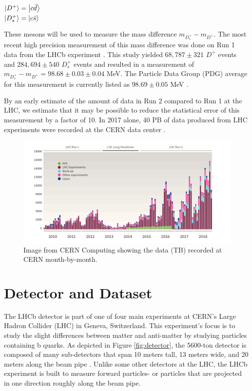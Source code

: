 \documentclass[12pt, letterpaper]{article}
\begin{document}
\begin{center}
$\ket{D^+} = \ket{c\bar{d}}$ \\
$\ket{D^+_s} = \ket{c\bar{s}}$ 
\end{center}

These mesons will be used to measure the mass difference $m_{D^+_s} - m_{D^+}$. The most recent high precision measurement of this mass difference was done on Run 1 data from the LHCb experiment \cite{lhcb}. This study yielded $68,787 \pm 321 $ $D^+$ events and $284,694 \pm 540 $ $D^+_s$ events and resulted in a measurement of $m_{D^+_s} - m_{D^+} = 98.68 \pm 0.03 \pm 0.04$ MeV. The Particle Data Group (PDG) average for this measurement is currently listed as $98.69 \pm 0.05$ MeV \cite{pdg}.

By an early estimate of the amount of data in Run 2 compared to Run 1 at the LHC, we estimate that it may be possible to reduce the statistical error of this measurement by a factor of 10. In 2017 alone, 40 PB of data produced from LHC experiments were recorded at the CERN data center \cite{cerncomp}.




\begin{figure}[h!]
\centering
\includegraphics[width=0.83\linewidth]{lhc_data.png}
\caption{Image from CERN Computing showing the data (TB) recorded at CERN month-by-month.}
\label{fig:storage}
\end{figure}







\newpage
\section{Detector and Dataset}
The LHCb detector is part of one of four main experiments at CERN’s Large Hadron
Collider (LHC) in Geneva, Switzerland. This experiment's focus is to study the slight differences between matter and anti-matter by studying particles containing b quarks.  As depicted in Figure \ref{fig:detector}, the 5600-ton detector is composed of many sub-detectors that span 10 meters tall, 13 meters wide, and 20 meters along the beam pipe \cite{detector2}. Unlike some other detectors at the LHC, the LHCb experiment is built to measure forward particles- or particles that are projected in one direction roughly along the beam pipe. 
\end{document}
